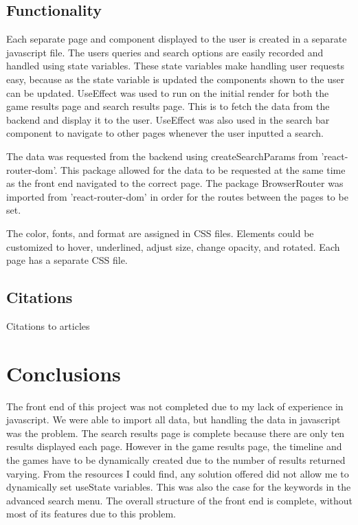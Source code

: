 \subsection{Functionality}
Each separate page and component displayed to the user is created in a separate javascript file. The users queries and search options are easily recorded and handled using state variables. These state variables make handling user requests easy, because as the state variable is updated the components shown to the user can be updated. UseEffect was used to run on the initial render for both the game results page and search results page. This is to fetch the data from the backend and display it to the user. UseEffect was also used in the search bar component to navigate to other pages whenever the user inputted a search. 

The data was requested from the backend using createSearchParams from 'react-router-dom'. This package allowed for the data to be requested at the same time as the front end navigated to the correct page. The package BrowserRouter was imported from 'react-router-dom' in order for the routes between the pages to be set. 

The color, fonts, and format are assigned in CSS files. Elements could be customized to hover, underlined, adjust size, change opacity, and rotated. Each page has a separate CSS file. 

\subsection{Citations}
Citations to articles

\section{Conclusions}
The front end of this project was not completed due to my lack of experience in javascript. We were able to import all data, but handling the data in javascript was the problem. The search results page is complete because there are only ten results displayed each page. However in the game results page, the timeline and the games have to be dynamically created due to the number of results returned varying. From the resources I could find, any solution offered did not allow me to dynamically set useState variables. This was also the case for the keywords in the advanced search menu. The overall structure of the front end is complete, without most of its features due to this problem. 



